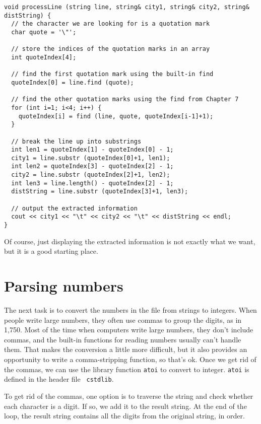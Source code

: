 
\begin{lstlisting}
void processLine (string line, string& city1, string& city2, string& distString) {
  // the character we are looking for is a quotation mark
  char quote = '\"';

  // store the indices of the quotation marks in an array
  int quoteIndex[4];

  // find the first quotation mark using the built-in find
  quoteIndex[0] = line.find (quote);

  // find the other quotation marks using the find from Chapter 7
  for (int i=1; i<4; i++) {
    quoteIndex[i] = find (line, quote, quoteIndex[i-1]+1);
  }

  // break the line up into substrings
  int len1 = quoteIndex[1] - quoteIndex[0] - 1;
  city1 = line.substr (quoteIndex[0]+1, len1);
  int len2 = quoteIndex[3] - quoteIndex[2] - 1;
  city2 = line.substr (quoteIndex[2]+1, len2);
  int len3 = line.length() - quoteIndex[2] - 1;
  distString = line.substr (quoteIndex[3]+1, len3);

  // output the extracted information
  cout << city1 << "\t" << city2 << "\t" << distString << endl;
}
\end{lstlisting}
%
Of course, just displaying the extracted information is not
exactly what we want, but it is a good starting place.

\section{Parsing numbers}
\label{parsingnums}

The next task is to convert the numbers in the file from strings to
integers.  When people write large numbers, they often use commas to
group the digits, as in 1,750.  Most of the time when computers write
large numbers, they don't include commas, and the built-in functions
for reading numbers usually can't handle them.  That makes the
conversion a little more difficult, but it also provides an
opportunity to write a comma-stripping function, so that's ok.  Once
we get rid of the commas, we can use the library function {\tt atoi}
to convert to integer.  {\tt atoi} is defined in the header file {\tt
cstdlib}.


To get rid of the commas, one option is to traverse the string and
check whether each character is a digit.  If so, we add it to the
result string.  At the end of the loop, the result string contains all
the digits from the original string, in order.

